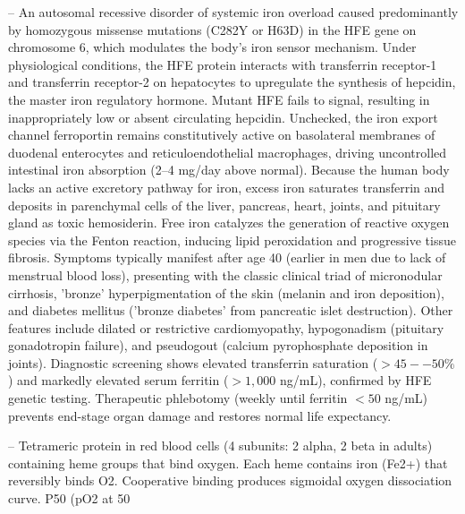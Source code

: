 -- An autosomal recessive disorder of systemic iron overload caused predominantly by homozygous missense mutations (C282Y or H63D) in the HFE gene on chromosome 6, which modulates the body's iron sensor mechanism. Under physiological conditions, the HFE protein interacts with transferrin receptor-1 and transferrin receptor-2 on hepatocytes to upregulate the synthesis of hepcidin, the master iron regulatory hormone. Mutant HFE fails to signal, resulting in inappropriately low or absent circulating hepcidin. Unchecked, the iron export channel ferroportin remains constitutively active on basolateral membranes of duodenal enterocytes and reticuloendothelial macrophages, driving uncontrolled intestinal iron absorption (2--4 mg/day above normal). Because the human body lacks an active excretory pathway for iron, excess iron saturates transferrin and deposits in parenchymal cells of the liver, pancreas, heart, joints, and pituitary gland as toxic hemosiderin. Free iron catalyzes the generation of reactive oxygen species via the Fenton reaction, inducing lipid peroxidation and progressive tissue fibrosis. Symptoms typically manifest after age 40 (earlier in men due to lack of menstrual blood loss), presenting with the classic clinical triad of micronodular cirrhosis, 'bronze' hyperpigmentation of the skin (melanin and iron deposition), and diabetes mellitus ('bronze diabetes' from pancreatic islet destruction). Other features include dilated or restrictive cardiomyopathy, hypogonadism (pituitary gonadotropin failure), and pseudogout (calcium pyrophosphate deposition in joints). Diagnostic screening shows elevated transferrin saturation ($>45--50\%$) and markedly elevated serum ferritin ($>1,000$ ng/mL), confirmed by HFE genetic testing. Therapeutic phlebotomy (weekly until ferritin $<50$ ng/mL) prevents end-stage organ damage and restores normal life expectancy.

-- Tetrameric protein in red blood cells (4 subunits: 2 alpha, 2 beta in adults) containing heme groups that bind oxygen. Each heme contains iron (Fe2+) that reversibly binds O2. Cooperative binding produces sigmoidal oxygen dissociation curve. P50 (pO2 at 50%

